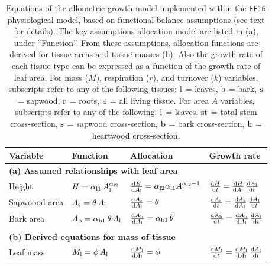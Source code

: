 \documentclass[10pt,twoside]{article}
\begin{document}
\begin{table}[h!]
\caption{Equations of the allometric growth model implemented within the \texttt{FF16} physiological model, based on functional-balance assumptions (see text for details).
The key assumptions allocation model are listed in (a), under ``Function''. From these
assumptions, allocation functions are derived for tissue areas and tissue masses (b). Also
the growth rate of each tissue type can be expressed as a function of the growth rate of leaf area. For mass ($M$), respiration ($r$), and turnover ($k$)
variables, subscripts refer to any of the following tissues: \({\rm l}\) = leaves, \({\rm b}\) = bark, \({\rm s}\) = sapwood,
\({\rm r}\) = roots, \({\rm a}\) = all living tissue. For area \(A\) variables, subscripts refer to any of the following: \({\rm l}\) = leaves, \({\rm st}\) = total stem cross-section, \({\rm s}\) = sapwood cross-section, \({\rm b}\) = bark cross-section, \({\rm h}\) = heartwood cross-section.}
\centering
\begin{tabular}{p{2.5cm}p{3.5cm}p{5cm}p{4cm} }\\ \hline
Variable & Function & Allocation & Growth rate\\ \hline
\multicolumn{4}{l}{\textbf{(a) Assumed relationships with leaf area}} \\
Height &
$H = \alpha_{{\rm l1}} \, A_{\rm l  }^{\alpha_{{\rm l2}}}$ &
$\frac{{\rm d}H}{{\rm d}A_{\rm l}} = \alpha_{{\rm l2}} \alpha_{{\rm l1}} A_{\rm l}^{\alpha_{{\rm l2}}-1}$ &
$\frac{{\rm d}H}{{\rm d}t} = \frac{{\rm d}H}{{\rm d}A_{\rm l}} \, \frac{{\rm d}A_{\rm l}}{{\rm d}t}$ \\
Sapwoood area &
$A_{\rm s} = \theta \, A_{\rm l}$ &
$\frac{{\rm d}A_{\rm s}}{{\rm d} A_{\rm l}} = \theta$ &
$\frac{{\rm d}A_{\rm s}}{{\rm d}t} = \frac{{\rm d}A_{\rm s}}{{\rm d} A_{\rm l}} \, \frac{{\rm d}A_{\rm l}}{{\rm d}t}$ \\
Bark area &
$A_{\rm b} = \alpha_{{\rm b1}} \, \theta \, A_{\rm l}$ &
$\frac{{\rm d}A_{\rm b}}{{\rm d} A_{\rm l}} = \alpha_{{\rm b1}} \, \theta$ &
$\frac{{\rm d}A_{\rm b}}{{\rm d}t} = \frac{{\rm d}A_{\rm b}}{{\rm d} A_{\rm l}} \, \frac{{\rm d}A_{\rm l}}{{\rm d}t}$ \\ \\
\multicolumn{4}{l}{\textbf{(b) Derived equations for mass of tissue }} \\
Leaf mass &
$M_{\rm l} = \phi \, A_{\rm l} $ &
$\frac{{\rm d}M_{\rm l}}{{\rm d}A_{\rm l}} = \phi$ &
$\frac{{\rm d}M_{\rm l}}{{\rm d}t} = \frac{{\rm d}M_{\rm l}}{{\rm d}A_{\rm l}} \, \frac{{\rm d}A_{\rm l}}{{\rm d}t}$ \\

\end{tabular}
\end{table}
\end{document}
